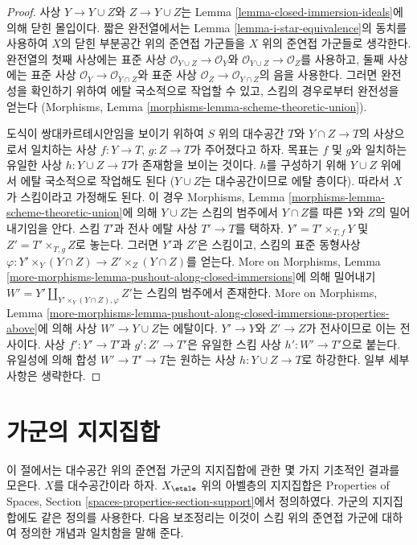 \begin{proof}
사상 $Y \to Y \cup Z$와 $Z \to Y \cup Z$는
Lemma \ref{lemma-closed-immersion-ideals}에 의해 닫힌 몰입이다.
짧은 완전열에서는 Lemma \ref{lemma-i-star-equivalence}의 동치를
사용하여 $X$의 닫힌 부분공간 위의 준연접 가군들을 $X$ 위의
준연접 가군들로 생각한다. 완전열의 첫째 사상에는 표준 사상
$\mathcal{O}_{Y \cup Z} \to \mathcal{O}_Y$와
$\mathcal{O}_{Y \cup Z} \to \mathcal{O}_Z$를 사용하고,
둘째 사상에는 표준 사상
$\mathcal{O}_Y \to \mathcal{O}_{Y \cap Z}$와 표준 사상
$\mathcal{O}_Z \to \mathcal{O}_{Y \cap Z}$의 음을 사용한다.
그러면 완전성을 확인하기 위하여 에탈 국소적으로 작업할 수 있고,
스킴의 경우로부터 완전성을 얻는다
(Morphisms, Lemma \ref{morphisms-lemma-scheme-theoretic-union}).

\medskip\noindent
도식이 쌍대카르테시안임을 보이기 위하여 $S$ 위의 대수공간
$T$와 $Y \cap Z \to T$의 사상으로서 일치하는 사상
$f : Y \to T$, $g : Z \to T$가 주어졌다고 하자.
목표는 $f$ 및 $g$와 일치하는 유일한 사상
$h : Y \cup Z \to T$가 존재함을 보이는 것이다.
$h$를 구성하기 위해 $Y \cup Z$ 위에서 에탈 국소적으로 작업해도 된다
($Y \cup Z$는 대수공간이므로 에탈 층이다).
따라서 $X$가 스킴이라고 가정해도 된다.
이 경우 Morphisms, Lemma
\ref{morphisms-lemma-scheme-theoretic-union}에 의해
$Y \cup Z$는 스킴의 범주에서 $Y \cap Z$를 따른 $Y$와 $Z$의
밀어내기임을 안다.
스킴 $T'$과 전사 에탈 사상 $T' \to T$를 택하자.
$Y' = T' \times_{T, f} Y$ 및 $Z' = T' \times_{T, g} Z$로 놓는다.
그러면 $Y'$과 $Z'$은 스킴이고, 스킴의 표준 동형사상
$\varphi : Y' \times_Y (Y \cap Z) \to Z' \times_Z (Y \cap Z)$를
얻는다. More on Morphisms, Lemma
\ref{more-morphisms-lemma-pushout-along-closed-immersions}에 의해
밀어내기 $W' = Y' \amalg_{Y' \times_Y (Y \cap Z), \varphi} Z'$는
스킴의 범주에서 존재한다. More on Morphisms, Lemma
\ref{more-morphisms-lemma-pushout-along-closed-immersions-properties-above}에
의해 사상 $W' \to Y \cup Z$는 에탈이다.
$Y' \to Y$와 $Z' \to Z$가 전사이므로 이는 전사이다.
사상 $f' : Y' \to T'$과 $g' : Z' \to T'$은 유일한 스킴 사상
$h' : W' \to T'$으로 붙는다. 유일성에 의해 합성
$W' \to T' \to T$는 원하는 사상 $h : Y \cup Z \to T$로 하강한다.
일부 세부사항은 생략한다.
\end{proof}

\section{가군의 지지집합}
\label{section-support}

\noindent
이 절에서는 대수공간 위의 준연접 가군의 지지집합에 관한 몇 가지
기초적인 결과를 모은다. $X$를 대수공간이라 하자.
$X_\etale$ 위의 아벨층의 지지집합은 Properties of Spaces,
Section \ref{spaces-properties-section-support}에서 정의하였다.
가군의 지지집합에도 같은 정의를 사용한다.
다음 보조정리는 이것이 스킴 위의 준연접 가군에 대하여 정의한
개념과 일치함을 말해 준다.

